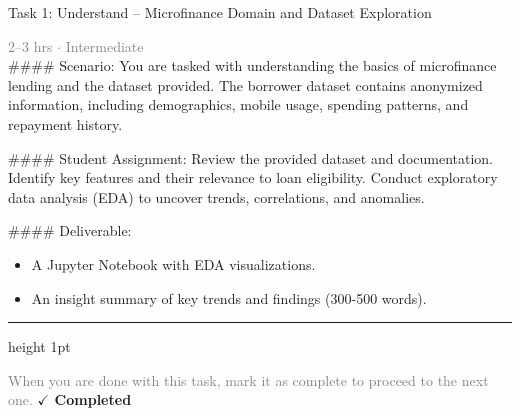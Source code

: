 \documentclass[10pt,a4paper]{article}
\begin{document}
\begin{taskbox}{Task 1: Understand – Microfinance Domain and Dataset Exploration}

    {\small \textcolor{gray}{2--3 hrs $\cdot$ Intermediate}}\\[12pt]

    \#\#\#\# Scenario:
You are tasked with understanding the basics of microfinance lending and the dataset provided. The borrower dataset contains anonymized information, including demographics, mobile usage, spending patterns, and repayment history.

\#\#\#\# Student Assignment:
Review the provided dataset and documentation. Identify key features and their relevance to loan eligibility. Conduct exploratory data analysis (EDA) to uncover trends, correlations, and anomalies.

\#\#\#\# Deliverable:
\begin{itemize}
    \item A Jupyter Notebook with EDA visualizations.
    \item An insight summary of key trends and findings (300-500 words).\par
\end{itemize}

    \vspace{16pt}

    \textcolor{cardBorder}{\hrule height 1pt}\vspace{8pt}

    \small \textcolor{gray}{When you are done with this task, mark it as complete to proceed to the next one.} \hfill \textbf{\textcolor{brandDark}{$\checkmark$ Completed}}

\end{taskbox}
\end{document}

